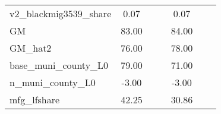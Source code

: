 \begin{table}[htbp]
\begin{tabular}{l*{2}{ccc}}
v2\_blackmig3539\_share&        0.07&            &            &        0.07&            &            \\
GM                  &       83.00&            &            &       84.00&            &            \\
GM\_hat2             &       76.00&            &            &       78.00&            &            \\
base\_muni\_county\_L0 &       79.00&            &            &       71.00&            &            \\
n\_muni\_county\_L0    &       -3.00&            &            &       -3.00&            &            \\
mfg\_lfshare         &       42.25&            &            &       30.86&            &            \\
\bottomrule
\end{tabular}
\end{table}
